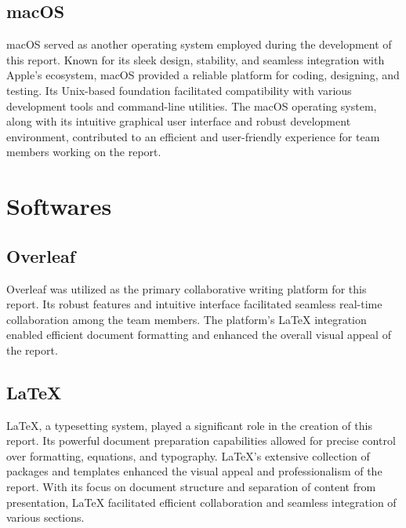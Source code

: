 \vspace{1cm}

\subsection*{macOS}

macOS served as another operating system employed during the development of this report. Known for its sleek design, stability, and seamless integration with Apple's ecosystem, macOS provided a reliable platform for coding, designing, and testing. Its Unix-based foundation facilitated compatibility with various development tools and command-line utilities. The macOS operating system, along with its intuitive graphical user interface and robust development environment, contributed to an efficient and user-friendly experience for team members working on the report.


\section*{Softwares}


\vspace{0.5cm}

\subsection*{Overleaf} 


Overleaf was utilized as the primary collaborative writing platform for this report. Its robust features and intuitive interface facilitated seamless real-time collaboration among the team members. The platform's LaTeX integration enabled efficient document formatting and enhanced the overall visual appeal of the report.

\vspace{1cm}

\subsection*{LaTeX}

LaTeX, a typesetting system, played a significant role in the creation of this report. Its powerful document preparation capabilities allowed for precise control over formatting, equations, and typography. LaTeX's extensive collection of packages and templates enhanced the visual appeal and professionalism of the report. With its focus on document structure and separation of content from presentation, LaTeX facilitated efficient collaboration and seamless integration of various sections.

